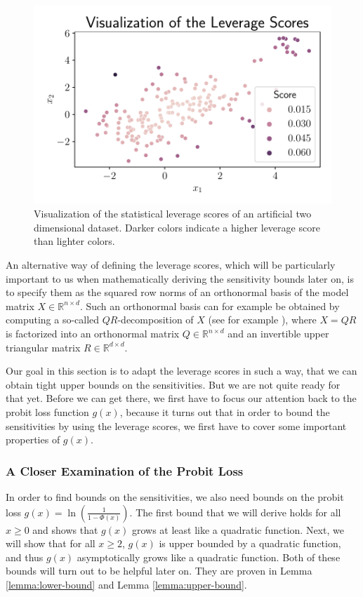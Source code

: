 \begin{figure}[t!]
    \centering
    \includegraphics[width=.7\linewidth]{figures/leverage_scores_visualization.pdf}
    \caption{Visualization of the statistical leverage scores of an
        artificial two dimensional dataset. Darker colors indicate a higher
        leverage score than lighter colors.}
    \label{fig:leverage-scores}
\end{figure}

An alternative way of defining the leverage scores, which will
be particularly important to us when mathematically deriving
the sensitivity bounds later on, is to specify them as
the squared row norms of an orthonormal basis of the model matrix
$X \in \mathbb{R}^{n \times d}$.
Such an orthonormal basis can for example be obtained
by computing a so-called $QR$-decomposition of $X$
(see for example \cite{matrix-computations}), where
$X = QR$ is factorized into an orthonormal matrix
$Q \in \mathbb{R}^{n \times d}$ and an invertible upper triangular
matrix $R \in \mathbb{R}^{d \times d}$.

Our goal in this section is to adapt the leverage scores in
such a way, that we can obtain tight upper bounds on the sensitivities.
But we are not quite ready for that yet.
Before we can get there, we first have to focus our attention back
to the probit loss function $g(x)$, because it turns out that in order
to bound the sensitivities by using the leverage scores, we first
have to cover some important properties of $g(x)$.

\subsubsection{A Closer Examination of the Probit Loss}

In order to find bounds on the sensitivities, we also
need bounds on the probit loss
$g(x) = \ln\left( \frac{1}{1 - \Phi(x)} \right)$.
The first bound that we will derive holds for all $x \geq 0$
and shows that $g(x)$ grows at least like a quadratic function.
Next, we will show that for all $x \geq 2$, $g(x)$ is upper
bounded by a quadratic function, and thus $g(x)$ asymptotically
grows like a quadratic function.
Both of these bounds will turn out to be helpful later
on. They are proven in Lemma \ref{lemma:lower-bound}
and Lemma \ref{lemma:upper-bound}.

